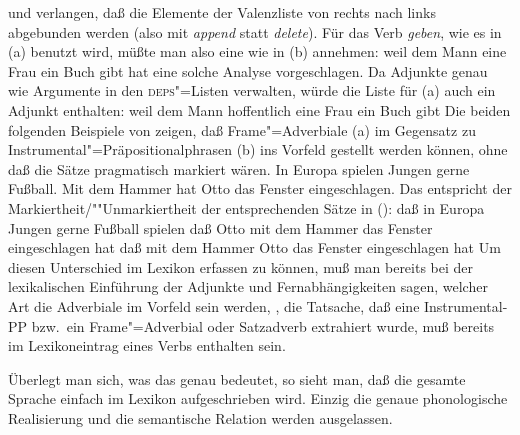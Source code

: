 und verlangen, daß die Elemente der Valenzliste von rechts nach links abgebunden werden
(also mit \emph{append} statt \emph{delete}). Für das Verb \emph{geben}, wie es in (a)
benutzt wird, müßte man also eine \subcatl wie in (b) annehmen:
\eal
\ex weil dem Mann eine Frau ein Buch gibt
\ex {}
\zl
\citet{Uszkoreit86b} hat eine solche Analyse vorgeschlagen.
Da \citet*{BMS2001a} Adjunkte genau wie Argumente in den \textsc{deps}"=Listen verwalten, würde die Liste
für (a) auch ein Adjunkt enthalten:
\eal
\ex weil dem Mann hoffentlich eine Frau ein Buch gibt
\ex {}
\zl
Die beiden folgenden Beispiele von \citet{Frey2004a} zeigen, daß
Frame"=Adverbiale (a) im Gegensatz zu Instrumental"=Präpositionalphrasen (b) ins
Vorfeld gestellt werden können, ohne daß die Sätze pragmatisch markiert wären.
\eal
\ex In Europa spielen Jungen gerne Fußball. 
\ex Mit dem Hammer hat Otto das Fenster eingeschlagen.
\zl
Das entspricht der Markiertheit/""Unmarkiertheit der entsprechenden Sätze in ():
\eal
\ex daß in Europa Jungen gerne Fußball spielen
\ex daß Otto mit dem Hammer das Fenster eingeschlagen hat
\ex daß mit dem Hammer Otto das Fenster eingeschlagen hat
\zl
Um diesen Unterschied im Lexikon erfassen zu können, muß man bereits bei der lexikalischen
Einführung der Adjunkte und Fernabhängigkeiten sagen, welcher Art die Adverbiale im Vorfeld
sein werden, \dash, die Tatsache, daß eine Instrumental-PP bzw.\ ein Frame"=Adverbial oder Satzadverb
extrahiert wurde, muß bereits im Lexikoneintrag eines Verbs enthalten sein.

Überlegt man sich, was das genau bedeutet, so sieht man, daß die gesamte Sprache einfach im Lexikon
aufgeschrieben wird. Einzig die genaue phonologische Realisierung und die semantische Relation
werden ausgelassen. 


